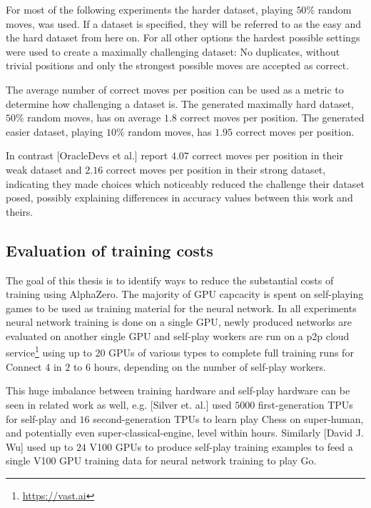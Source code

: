 \documentclass[12pt,onecolumn,oneside,titlepage]{article}
\begin{document}
For most of the following experiments the harder dataset, playing $50\%$ random moves, was used. If a dataset is specified, they will be referred to as the easy and the hard dataset from here on.
For all other options the hardest possible settings were used to create a maximally challenging dataset:
No duplicates, without trivial positions and only the strongest possible moves are accepted as correct.

The average number of correct moves per position can be used as a metric to determine how challenging a dataset is. The generated maximally hard dataset, $50\%$ random moves, has on average $1.8$ correct moves per position.
The generated easier dataset, playing $10\%$ random moves, has $1.95$ correct moves per position.

In contrast \cite{oracledevs}[OracleDevs et al.] report $4.07$ correct moves per position in their weak dataset and $2.16$ correct moves per position in their strong dataset, indicating they made choices which noticeably reduced the challenge their dataset posed, 
possibly explaining differences in accuracy values between this work and theirs.

\subsection{Evaluation of training costs}

The goal of this thesis is to identify ways to reduce the substantial costs of training using AlphaZero. The majority of GPU capcacity is spent on self-playing games to be used as training material for the neural network.
In all experiments neural network training is done on a single GPU, newly produced networks are evaluated on another single GPU and self-play workers are run on a p2p cloud service\footnote{\url{https://vast.ai}} using up to 20 GPUs of various types to complete full training runs
for Connect 4 in $2$ to $6$ hours, depending on the number of self-play workers.

This huge imbalance between training hardware and self-play hardware can be seen in related work as well, e.g. \cite{AlphaZero}[Silver et. al.] used $5000$ first-generation TPUs for self-play and $16$ second-generation TPUs 
to learn play Chess on super-human, and potentially even super-classical-engine, level within hours. Similarly \cite{wu2019accelerating}[David J. Wu] used up to $24$ V100 GPUs to produce self-play training examples to feed a single V100 GPU training data for neural network training to play Go.
\end{document}
